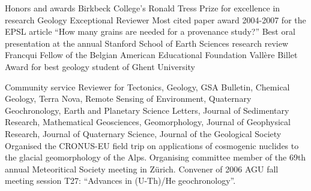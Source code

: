 \documentclass{resume}
\begin{document}

\begin{category}{Honors and awards}
 Birkbeck College's Ronald Tress Prize for excellence in research 
 Geology Exceptional Reviewer
\citembullet Most cited paper award 2004-2007 for the EPSL article 
``How many grains are needed for a provenance study?''
\citembullet Best oral presentation at the annual Stanford School of Earth Sciences research review
\citembullet Francqui Fellow of the Belgian American Educational Foundation 
\citembullet Vall\`{e}re Billet Award for best geology student of Ghent University
\end{category}




\begin{category}{Community service}
  \citembullet Reviewer for Tectonics, Geology, GSA Bulletin, Chemical Geology, Terra Nova, 
Remote Sensing of Environment, Quaternary Geochronology, Earth and Planetary Science Letters, 
Journal of Sedimentary Research, Mathematical Geosciences, Geomorphology, Journal of Geophysical Research,
Journal of Quaternary Science, Journal of the Geological Society
  \citembullet Organised the CRONUS-EU field trip on applications of cosmogenic nuclides to the 
  glacial geomorphology of the Alps.
  \citembullet Organising committee member of the 69th annual Meteoritical Society meeting in Z\"{u}rich.
  \citembullet Convener of 2006 AGU fall meeting session T27: ``Advances in (U-Th)/He geochronology''.
\end{category}

\clearpage

\end{document}
